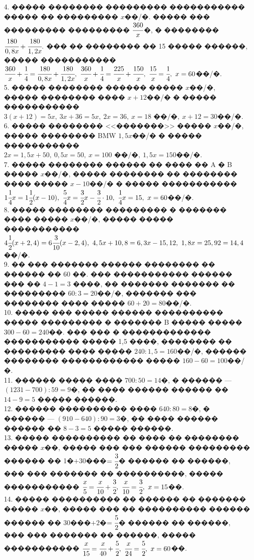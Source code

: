 \documentclass[12pt]{article}
\begin{document}
4. ����� �������� ��������� ����������� ����� �� ��������� $x$��/�. ����� ��� ��������� ��������� $\cfrac{360}{x}$�, � �������� $\cfrac{180}{0,8x}+\cfrac{180}{1,2x}.$ ��� �� �������� �� 15 ����� ������, ����� ����������� $\cfrac{360}{x}+\cfrac{1}{4}=\cfrac{180}{0,8x}+\cfrac{180}{1,2x},\ \cfrac{360}{x}+\cfrac{1}{4}=\cfrac{225}{x}+\cfrac{150}{x},\ \cfrac{15}{x}=\cfrac{1}{4},\ x=60$��/�.\\
5. ����� �������� ������ ����� $x$��/�, ����� �������� ���� $x+12$��/� � ����� ����������� $3(x+12)=5x,\ 3x+36=5x,\ 2x=36,\ x=18\text{ ��/�},\ x+12=30$��/�.\\
6. ����� �������� <<�������>> ����� $x$��/�, ����� �������� BMW $1,5x$��/� � ����� ����������� $2x=1,5x+50,\ 0,5x=50,\ x=100\text{ ��/�},\ 1,5x=150$��/�.\\
7. ����� �������� ������ �� ���� �� A � B ����� $x$��/�, ����� �������� �� �������� ���� ����� $x-10$��/� � ����� ����������� $1\cfrac{1}{4}x=1\cfrac{1}{2}(x-10),\
\cfrac{5}{4}x=\cfrac{3}{2}x-\cfrac{3}{2}\cdot10,\ \cfrac{1}{4}x=15,\ x=60$��/�.\\
8. ����� �������� ��������� � ������� ���� ����� $x$��/�, ����� ����� ����������� $4\cfrac{1}{2}(x+2,4)=6\cfrac{3}{10}(x-2,4),\ 4,5x+10,8=6,3x-15,12,\
1,8x=25,92=14,4$��/�.\\
9. �� ��� ������� ������ �������� �� ������ �� 60 ��. ��� ����������� ������ ��� �� $4-1=3$ ����, �� ������� ������� �� ��������� $60:3=20$��/�, ������� ��� �������� ���� ����� $60+20=80$��/�.\\
10. ����� ��� ����� ������ ���������� ����� ��������� � ������� B ����� ����� $300-60=240$��. ��� ��� � ������������� ����������� ����� 1,5 ����, �������� �� ��������� ���� ����� $240:1,5=160$��/�, ������ �������� ������������ ����� $160-60=100$��/�.\\
11. ������ ����� ���� $700:50=14$�, � ������ --- $(1231-700):59=9$�, �� ���� ������ ������ �� $14-9=5$ ����� ������.\\
12. ������ ���������� ���� $640:80=8$�, � ������ --- $(910-640):90=3$�, �� ���� ������ ������ �� $8-3=5$ ����� ������.\\
13. ����� ���������� �� ���� �� �������� ����� $x$��, ����� ��� ��� ������ ��������� ������ �� 1�$+$30���$=\cfrac{3}{2}$� ������ �� ������, ��� ��� ������� �� ����������, ����� ����������� $\cfrac{x}{5}=\cfrac{x}{10}+\cfrac{3}{2},\ \cfrac{x}{10}=\cfrac{3}{2},\ x=15$��.\\
14. ����� ���������� �� ������ �� ������� ����� $x$��, ����� ��� �� ���������� ������ ������ �� 30���$+2$�$=\cfrac{5}{2}$� ������ �� ������, ��� ��� ������� �� ������, ����� ����������� $\cfrac{x}{15}=\cfrac{x}{40}+\cfrac{5}{2},\ \cfrac{x}{24}=\cfrac{5}{2},\ x=60$��.\\
\end{document}
